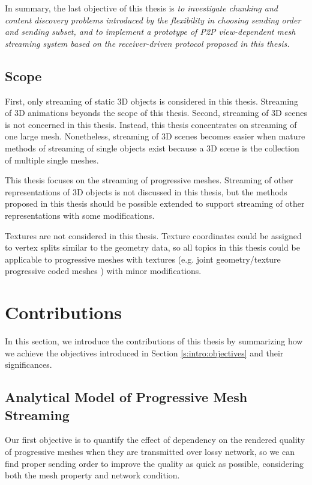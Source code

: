     In summary, the last objective of this thesis is 
    \textit{
            to investigate chunking and content discovery problems introduced by 
            the flexibility in choosing sending order and sending subset, and
            to implement a prototype of P2P view-dependent mesh streaming system
            based on the receiver-driven protocol proposed in this thesis.
            }
    
    \subsection{Scope}
            First, only streaming of static 3D objects is considered in this thesis. 
            Streaming of 3D animations beyonds the scope of this thesis. 
            Second, streaming of 3D scenes is not concerned in this thesis.
            Instead, this thesis concentrates on streaming of one large mesh.
            Nonetheless, streaming of 3D scenes becomes easier when mature methods
            of streaming of single objects exist because a 3D scene is the collection
            of multiple single meshes.
            
            This thesis focuses on the streaming of progressive meshes. 
            Streaming of other representations of 3D objects is not discussed in this thesis,
            but the methods proposed in this thesis should be possible
            extended to support streaming of other representations with some modifications.
            
            Textures are not considered in this thesis. Texture coordinates could be assigned
            to vertex splits similar to the geometry data, so all topics in this thesis could
            be applicable to progressive meshes with textures (e.g. joint geometry/texture progressive coded meshes 
            \cite{joint:okuda}) with minor modifications. 
  \section{Contributions}
  \label{s:intro:contributions}
    In this section, we introduce the contributions of this thesis by
    summarizing how we achieve the objectives introduced in 
    Section \ref{s:intro:objectives} and their significances.
    
    \subsection{Analytical Model of Progressive Mesh Streaming}
    Our first objective is to quantify the effect of dependency
    on the rendered quality of progressive meshes when they are
    transmitted over lossy network, so we can find proper sending
    order to improve the quality as quick as possible,
    considering both the mesh property and network condition. 
            
